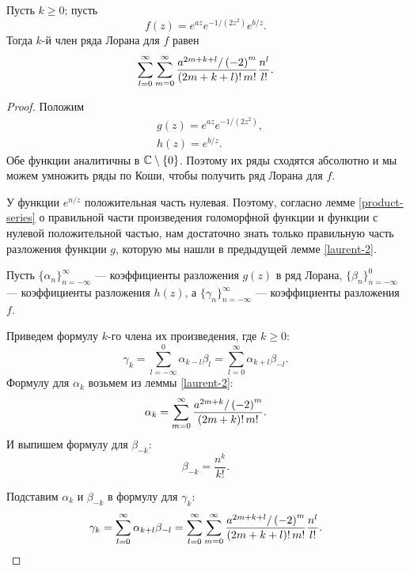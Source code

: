 \documentclass[../paper.tex]{subfiles}
\begin{document}
\begin{Lem}
\label{laurent-3}
Пусть $k \ge 0$; пусть
\[
    f(z) = e^{az} e^{-1/(2z^2)} e^{b/z}
.\]
Тогда $k$-й член ряда Лорана для $f$ равен
\[
    \sum_{l=0}^{\infty}
    \sum_{m=0}^{\infty} \frac{a^{2m+k+l} / \left( -2 \right)^m}{(2m+k+l)!\,m!} \\
    \frac{n^l}{l!}
.\]
\end{Lem}
\begin{proof}
Положим
\begin{align*}
    & g(z) = e^{az} e^{-1/(2z^2)}, \\
    & h(z) = e^{b/z}
.\end{align*}
Обе функции аналитичны в $\mathbb{C} \setminus \{0\}$.
Поэтому их ряды сходятся абсолютно и мы можем умножить ряды по Коши, чтобы получить ряд Лорана для $f$.

У функции $e^{n/z}$ положительная часть нулевая.
Поэтому, согласно лемме \ref{product-series} о правильной части произведения голоморфной функции и функции с нулевой положительной частью, 
нам достаточно знать только правильную часть разложения функции $g$, которую мы нашли в предыдущей лемме \ref{laurent-2}.

Пусть $\{\alpha_n\}_{n=-\infty}^\infty$ --- коэффициенты разложения $g(z)$ в ряд Лорана, $\{\beta_n\}_{n=-\infty}^0$ --- коэффициенты разложения $h(z)$,
а $\{\gamma_n\}_{n=-\infty}^\infty$ --- коэффициенты разложения $f$.

Приведем формулу $k$-го члена их произведения, где $k \ge 0$:
\[
    \gamma_k =
    \sum_{l=-\infty}^{0} \alpha_{k-l} \beta_l =
    \sum_{l=0}^{\infty} \alpha_{k+l} \beta_{-l}
.\]
Формулу для $\alpha_k$ возьмем из леммы \ref{laurent-2}:
\[
	\alpha_k = \sum_{m=0}^{\infty} \frac{a^{2m+k} / \left( -2 \right)^m}{(2m+k)!\,m!} \\
.\]
И выпишем формулу для $\beta_{-k}$:
\[
	\beta_{-k} = \frac{n^k}{k!}
.\]

Подставим $\alpha_k$ и $\beta_{-k}$ в формулу для $\gamma_k$:
\[
    \gamma_k =
    \sum_{l=0}^{\infty} \alpha_{k+l} \beta_{-l} =
%
    \sum_{l=0}^{\infty}
    \sum_{m=0}^{\infty} \frac{a^{2m+k+l} / \left( -2 \right)^m}{(2m+k+l)!\,m!} \\
    \frac{n^l}{l!}
.\]
\end{proof}
\end{document}
